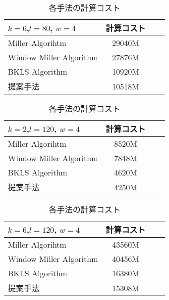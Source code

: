 \begin{table}[htbp]
 \begin{center}
  \begin{tabular}{|l|c|c|c|}
  \hline

  $k=6$,$l=80$, $w=4$ & 計算コスト \\
  \hline
  Miller Algorihtm & 29040M \\
  \hline
  Window Miller Algorithm & 27876M \\
  \hline
  BKLS Algorithm &  10920M \\
  \hline
  提案手法 & 10518M \\
  \hline
  \end{tabular}
 \end{center}
 \caption{各手法の計算コスト}
\end{table}

\begin{table}[htbp]
 \begin{center}
  \begin{tabular}{|l|c|c|c|}
  \hline
  $k=2$,$l=120$, $w=4$ & 計算コスト \\
  \hline
  Miller Algorihtm & 8520M \\
  \hline
  Window Miller Algorithm & 7848M \\
  \hline
  BKLS Algorithm &  4620M \\
  \hline
  提案手法 & 4250M \\
  \hline
  \end{tabular}
 \end{center}
 \caption{各手法の計算コスト}
\end{table}

\clearpage

\begin{table}[htbp]
 \begin{center}
  \begin{tabular}{|l|c|c|c|}
  \hline
  $k=6$,$l=120$, $w=4$ & 計算コスト \\
  \hline
  Miller Algorihtm & 43560M \\
  \hline
  Window Miller Algorithm & 40456M \\
  \hline
  BKLS Algorithm &  16380M \\
  \hline
  提案手法 & 15308M \\
  \hline
  \end{tabular}
 \end{center}
 \caption{各手法の計算コスト}
\end{table}

